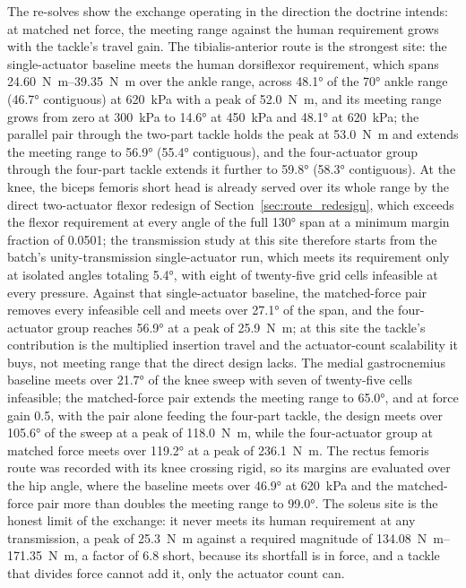 \documentclass[utf8]{FrontiersinHarvard} %
\begin{document}
The re-solves show the exchange operating in the direction the doctrine intends: at matched net force, the meeting range against the human requirement grows with the tackle's travel gain. The tibialis-anterior route is the strongest site: the single-actuator baseline meets the human dorsiflexor requirement, which spans \qtyrange{24.60}{39.35}{\newton\meter} over the ankle range, across \ang{48.1} of the \ang{70} ankle range (\ang{46.7} contiguous) at \qty{620}{\kPa} with a peak of \qty{52.0}{\newton\meter}, and its meeting range grows from zero at \qty{300}{\kPa} to \ang{14.6} at \qty{450}{\kPa} and \ang{48.1} at \qty{620}{\kPa}; the parallel pair through the two-part tackle holds the peak at \qty{53.0}{\newton\meter} and extends the meeting range to \ang{56.9} (\ang{55.4} contiguous), and the four-actuator group through the four-part tackle extends it further to \ang{59.8} (\ang{58.3} contiguous). At the knee, the biceps femoris short head is already served over its whole range by the direct two-actuator flexor redesign of Section~\ref{sec:route_redesign}, which exceeds the flexor requirement at every angle of the full \ang{130} span at a minimum margin fraction of 0.0501; the transmission study at this site therefore starts from the batch's unity-transmission single-actuator run, which meets its requirement only at isolated angles totaling \ang{5.4}, with eight of twenty-five grid cells infeasible at every pressure. Against that single-actuator baseline, the matched-force pair removes every infeasible cell and meets over \ang{27.1} of the span, and the four-actuator group reaches \ang{56.9} at a peak of \qty{25.9}{\newton\meter}; at this site the tackle's contribution is the multiplied insertion travel and the actuator-count scalability it buys, not meeting range that the direct design lacks. The medial gastrocnemius baseline meets over \ang{21.7} of the knee sweep with seven of twenty-five cells infeasible; the matched-force pair extends the meeting range to \ang{65.0}, and at force gain 0.5, with the pair alone feeding the four-part tackle, the design meets over \ang{105.6} of the sweep at a peak of \qty{118.0}{\newton\meter}, while the four-actuator group at matched force meets over \ang{119.2} at a peak of \qty{236.1}{\newton\meter}. The rectus femoris route was recorded with its knee crossing rigid, so its margins are evaluated over the hip angle, where the baseline meets over \ang{46.9} at \qty{620}{\kPa} and the matched-force pair more than doubles the meeting range to \ang{99.0}. The soleus site is the honest limit of the exchange: it never meets its human requirement at any transmission, a peak of \qty{25.3}{\newton\meter} against a required magnitude of \qtyrange{134.08}{171.35}{\newton\meter}, a factor of 6.8 short, because its shortfall is in force, and a tackle that divides force cannot add it, only the actuator count can.
\end{document}

